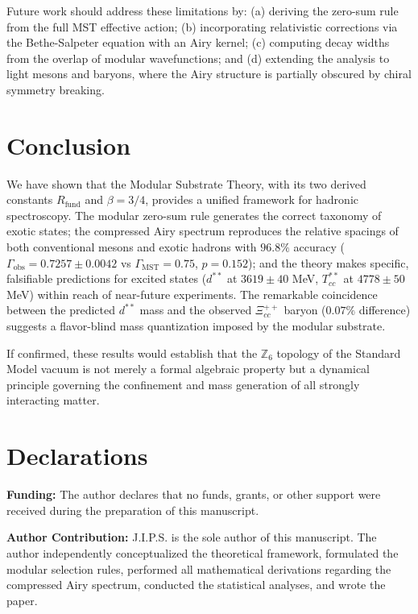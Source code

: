 \documentclass[12pt,a4paper]{article}
\theoremstyle{plain}
\theoremstyle{definition}
\theoremstyle{remark}
\begin{document}
Future work should address these limitations by: (a) deriving the zero-sum rule from the full MST effective action; (b) incorporating relativistic corrections via the Bethe-Salpeter equation with an Airy kernel; (c) computing decay widths from the overlap of modular wavefunctions; and (d) extending the analysis to light mesons and baryons, where the Airy structure is partially obscured by chiral symmetry breaking.

\section{Conclusion}
\label{sec:conclusion}

We have shown that the Modular Substrate Theory, with its two derived constants \(R_{\text{fund}}\) and \(\beta=3/4\), provides a unified framework for hadronic spectroscopy. The modular zero-sum rule generates the correct taxonomy of exotic states; the compressed Airy spectrum reproduces the relative spacings of both conventional mesons and exotic hadrons with \(96.8\%\) accuracy (\(\Gamma_{\text{obs}} = 0.7257 \pm 0.0042\) vs \(\Gamma_{\text{MST}} = 0.75\), \(p = 0.152\)); and the theory makes specific, falsifiable predictions for excited states (\(d^{**}\) at \(3619 \pm 40\) MeV, \(T_{cc}^{**}\) at \(4778 \pm 50\) MeV) within reach of near-future experiments. The remarkable coincidence between the predicted \(d^{**}\) mass and the observed \(\Xi_{cc}^{++}\) baryon (\(0.07\%\) difference) suggests a flavor-blind mass quantization imposed by the modular substrate.

If confirmed, these results would establish that the \(\mathbb{Z}_6\) topology of the Standard Model vacuum is not merely a formal algebraic property but a dynamical principle governing the confinement and mass generation of all strongly interacting matter.


\section*{Declarations}

\textbf{Funding:} The author declares that no funds, grants, or other support were received during the preparation of this manuscript.

\vspace{0.5em}
\noindent\textbf{Author Contribution:} J.I.P.S. is the sole author of this manuscript. The author independently conceptualized the theoretical framework, formulated the modular selection rules, performed all mathematical derivations regarding the compressed Airy spectrum, conducted the statistical analyses, and wrote the paper.
\end{document}
